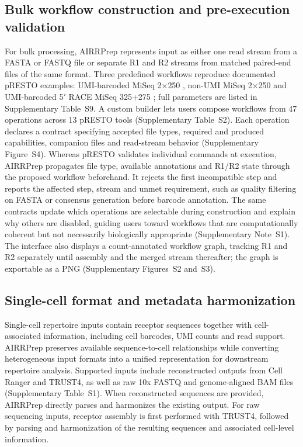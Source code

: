 \documentclass[unnumsec,webpdf,contemporary,large]{oup-authoring-template}
\begin{document}
\subsection{Bulk workflow construction and pre-execution validation}
For bulk processing, AIRRPrep represents input as either one read stream from a FASTA or FASTQ file or separate R1 and R2 streams from matched paired-end files of the same format. Three predefined workflows reproduce documented pRESTO examples: UMI-barcoded MiSeq 2$\times$250 \citep{stern2014}, non-UMI MiSeq 2$\times$250 \citep{greiff2014} and UMI-barcoded 5$'$ RACE MiSeq 325+275 \citep{vanderheiden2017}; full parameters are listed in Supplementary Table~S9. A custom builder lets users compose workflows from 47 operations across 13 pRESTO tools (Supplementary Table~S2).
Each operation declares a contract specifying accepted file types, required and produced capabilities, companion files and read-stream behavior (Supplementary Figure~S4). Whereas pRESTO validates individual commands at execution, AIRRPrep propagates file type, available annotations and R1/R2 state through the proposed workflow beforehand. It rejects the first incompatible step and reports the affected step, stream and unmet requirement, such as quality filtering on FASTA or consensus generation before barcode annotation. The same contracts update which operations are selectable during construction and explain why others are disabled, guiding users toward workflows that are computationally coherent but not necessarily biologically appropriate (Supplementary Note~S1).
The interface also displays a count-annotated workflow graph, tracking R1 and R2 separately until assembly and the merged stream thereafter; the graph is exportable as a PNG (Supplementary Figures~S2 and~S3).

\subsection{Single-cell format and metadata harmonization}

Single-cell repertoire inputs contain receptor sequences together with cell-associated information, including cell barcodes, UMI counts and read support. AIRRPrep preserves available sequence-to-cell relationships while converting heterogeneous input formats into a unified representation for downstream repertoire analysis. Supported inputs include reconstructed outputs from Cell Ranger and TRUST4, as well as raw 10x FASTQ and genome-aligned BAM files (Supplementary Table~S1). When reconstructed sequences are provided, AIRRPrep directly parses and harmonizes the existing output. For raw sequencing inputs, receptor assembly is first performed with TRUST4, followed by parsing and harmonization of the resulting sequences and associated cell-level information.
\end{document}

